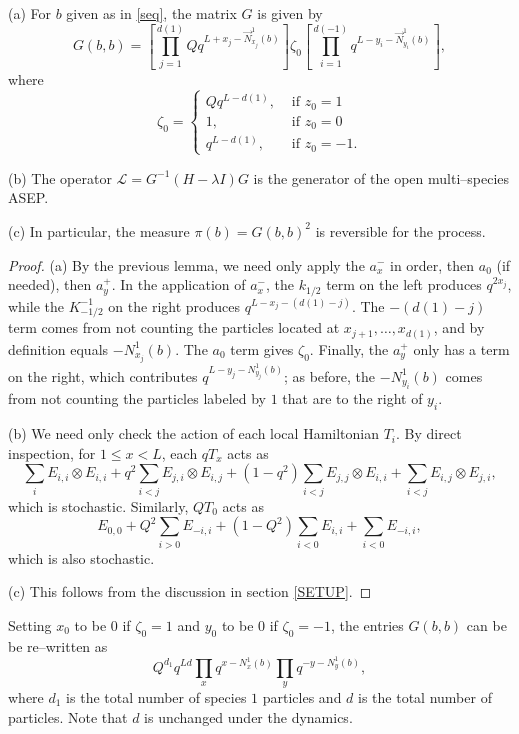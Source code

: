 \documentclass[12pt]{ximera}
\begin{document}
\begin{proposition}
(a) For $b$ given as in \eqref{seq}, the matrix $G$ is given by 
$$
G(b,b) = \left[\prod_{j=1}^{d(1)} Q q^{L+x_j-\vec{N}_{x_j}^1(b)} \right] \zeta_0 \left[\prod_{i=1}^{d(-1)} q^{L-y_i-\vec{N}^1_{y_i}(b)}\right],
$$
where
$$
\zeta_0
= 
\begin{cases}
Qq^{L-d(1)}, &\text{ if } z_0=1\\
1, &\text{ if } z_0=0\\
q^{L-d(1)}, &\text{ if } z_0=-1.
\end{cases}
$$

(b) The operator $\mathcal{L}=G^{-1}(H-\lambda I)G$ is the generator of the open multi--species ASEP.

(c) In particular, the measure $\pi(b) = G(b,b)^2$ is reversible for the process. 
\end{proposition}
\begin{proof}
(a) By the previous lemma, we need only apply the $a^-_x$ in order, then $a_0$ (if needed), then $a^+_y$. In the application of $a_x^-$, the $k_{1/2}$ term on the left produces $q^{2x_j}$, while the $K_{-1/2}^{-1}$ on the right produces $q^{L-x_j-(d(1)-j)}$. The $-(d(1)-j)$ term comes from not counting the particles located at $x_{j+1},\ldots,x_{d(1)}$, and by definition equals $-N_{x_j}^1(b)$. The $a_0$ term gives $\zeta_0$. Finally, the $a^+_y$ only has a term on the right, which contributes $q^{L-y_j-N^1_{y_j}(b)}$; as before, the $-N_{y_i}^1(b)$ comes from not counting the particles labeled by $1$ that are to the right of $y_i$. 

(b) We need only check the action of each local Hamiltonian $T_i$. By direct inspection, for $1 \leq x <L$, each $qT_x$ acts as 
$$
 \sum_i E_{i,i} \otimes E_{i,i} +q^2 \sum_{i<j} E_{j,i} \otimes E_{i,j} + (1-q^2)\sum_{i<j} E_{j,j} \otimes E_{i,i} +  \sum_{i<j} E_{i,j} \otimes E_{j,i},
$$
which is stochastic. Similarly, $QT_0$ acts as 
$$
 E_{0,0} + Q^2 \sum_{i>0} E_{-i,i} + (1-Q^2)\sum_{i<0} E_{i,i} +  \sum_{i<0} E_{-i,i},
$$
which is also stochastic. 

(c) This follows from the discussion in section \ref{SETUP}.
\end{proof}

\begin{remark}
Setting $x_0$ to be $0$ if $\zeta_0=1$ and $y_0$ to be $0$ if $\zeta_0=-1$, the entries $G(b,b)$ can be be re--written as
$$
Q^{d_1} q^{Ld} \prod_{x} q^{x - N_x^1(b) }\prod_y q^{-y - N_y^1(b)},
$$
where $d_1$ is the total number of species $1$ particles and $d$ is the total number of particles. Note that $d$ is unchanged under the dynamics. 
\end{remark}
\end{document}
